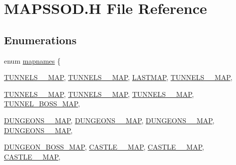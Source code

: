 \hypertarget{MAPSSOD_8H}{
\section{MAPSSOD.H File Reference}
\label{MAPSSOD_8H}
}
\subsection*{Enumerations}
\begin{DoxyCompactItemize}
\item 
enum \hyperlink{MAPSSOD_8H_a1949852ef0462081a2b248dd4918bb86}{mapnames} \{ \par
\hyperlink{MAPSSDM_8H_a1949852ef0462081a2b248dd4918bb86acbdf704da923641aa047528fadd773fa}{TUNNELS\_\_\-MAP}, 
\hyperlink{MAPSSDM_8H_a1949852ef0462081a2b248dd4918bb86a0714d98acd387ceab72b37c2ce15337b}{TUNNELS\_\_\-MAP}, 
\hyperlink{MAPSSDM_8H_a1949852ef0462081a2b248dd4918bb86ad3af5aeeef56724be68af11d0a6680b3}{LASTMAP}, 
\hyperlink{MAPSSOD_8H_a1949852ef0462081a2b248dd4918bb86acbdf704da923641aa047528fadd773fa}{TUNNELS\_\_\-MAP}, 
\par
\hyperlink{MAPSSOD_8H_a1949852ef0462081a2b248dd4918bb86a0714d98acd387ceab72b37c2ce15337b}{TUNNELS\_\_\-MAP}, 
\hyperlink{MAPSSOD_8H_a1949852ef0462081a2b248dd4918bb86a0d874dc7ecc82a838419319fdf1e8981}{TUNNELS\_\_\-MAP}, 
\hyperlink{MAPSSOD_8H_a1949852ef0462081a2b248dd4918bb86acaaf614245869150fddf14e70c58e814}{TUNNELS\_\_\-MAP}, 
\hyperlink{MAPSSOD_8H_a1949852ef0462081a2b248dd4918bb86a00ffe67ecf2d79d6e249734e3c10f835}{TUNNEL\_\-BOSS\_\-MAP}, 
\par
\hyperlink{MAPSSOD_8H_a1949852ef0462081a2b248dd4918bb86a2a41440fb231f456ba48a61b3750a433}{DUNGEONS\_\_\-MAP}, 
\hyperlink{MAPSSOD_8H_a1949852ef0462081a2b248dd4918bb86a71604e9c0be7e84b7a077e1014d16551}{DUNGEONS\_\_\-MAP}, 
\hyperlink{MAPSSOD_8H_a1949852ef0462081a2b248dd4918bb86ac36508495618f8433a43efca3cb5db5d}{DUNGEONS\_\_\-MAP}, 
\hyperlink{MAPSSOD_8H_a1949852ef0462081a2b248dd4918bb86a708337f0295e8e4da5d955451956a603}{DUNGEONS\_\_\-MAP}, 
\par
\hyperlink{MAPSSOD_8H_a1949852ef0462081a2b248dd4918bb86a1b3c9e6cc77c7f84b6ae038051781e3d}{DUNGEON\_\-BOSS\_\-MAP}, 
\hyperlink{MAPSSOD_8H_a1949852ef0462081a2b248dd4918bb86a4c9c00b088ae5f84423f30ea9fa44f33}{CASTLE\_\_\-MAP}, 
\hyperlink{MAPSSOD_8H_a1949852ef0462081a2b248dd4918bb86acb20a9eff2b66ec774cd4516ad2c6d13}{CASTLE\_\_\-MAP}, 
\hyperlink{MAPSSOD_8H_a1949852ef0462081a2b248dd4918bb86a06b22b4044c73d114ec301f7e57fb22c}{CASTLE\_\_\-MAP}, 

\end{DoxyCompactItemize}

